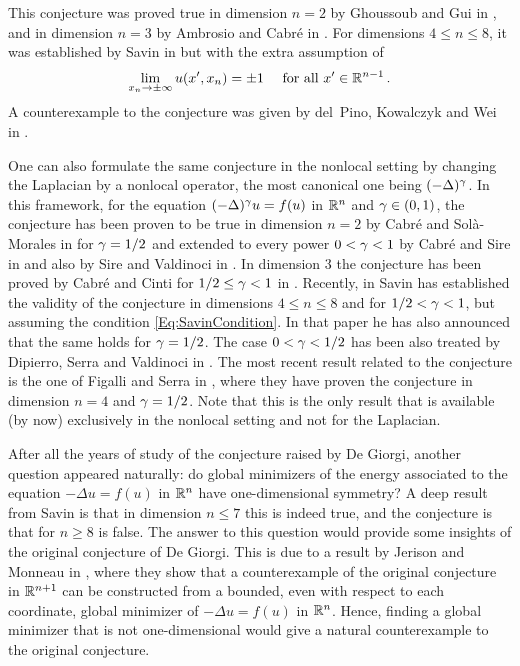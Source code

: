 This conjecture was proved true in dimension $n=2$ by Ghoussoub and Gui in \cite{GhoussoubGui}, and in dimension $n=3$ by Ambrosio and Cabré in \cite{AmbrosioCabre}. For dimensions $4\leq n \leq 8$, it was established by Savin in \cite{Savin-DeGiorgi} but with the extra assumption of
\begin{equation}
\label{Eq:SavinCondition}
	\lim_{x_n \to \pm \infty} u(x',x_n) = \pm 1 \quad \text{ for all } x'\in \mathbb{R}^{n-1}\,.
\end{equation}
A counterexample to the conjecture was given by del~Pino, Kowalczyk and Wei in \cite{delPinoKowalczykWei}. 


One can also formulate the same conjecture in the nonlocal setting by changing the Laplacian by a nonlocal operator, the most canonical one being $(-\Delta)^\gamma$. In this framework, for the equation $(-\Delta)^\gamma u = f(u)$ in $\mathbb{R}^n$ and $\gamma\in (0,1)$, the conjecture has been proven to be true in dimension $n=2$ by Cabré and Solà-Morales in \cite{CabreSolaMorales} for $\gamma=1/2$ and extended to every power $0<\gamma<1$ by Cabré and Sire in \cite{CabreSireI} and also by Sire and Valdinoci in \cite{SireValdinoci}. In dimension $3$ the conjecture has been proved by Cabré and Cinti for $1/2 \leq \gamma < 1$ in \cite{CabreCinti-EnergyHalfL, CabreCinti-SharpEnergy}. Recently, in \cite{Savin-Fractional} Savin has established the validity of the conjecture in dimensions $4\leq n \leq 8$ and for $1/2 < \gamma < 1$, but assuming the condition \eqref{Eq:SavinCondition}. In that paper he has also announced that the same holds for $\gamma=1/2$. The case $0<\gamma<1/2$ has been also treated by Dipierro, Serra and Valdinoci in \cite{DipierroSerraValdinoci} . The most recent result related to the conjecture is the one of Figalli and Serra in \cite{FigalliSerra}, where they have proven the conjecture in dimension $n=4$ and $\gamma=1/2$. Note that this is the only result that is available (by now) exclusively in the nonlocal setting and not for the Laplacian.

After all the years of study of the conjecture raised by De Giorgi, another question appeared naturally: do global minimizers of the energy associated to the equation  $-\Delta u = f(u)$ in $\mathbb{R}^n$ have one-dimensional symmetry? A deep result from Savin \cite{Savin-DeGiorgi} is that in dimension $n \leq 7$ this is indeed true, and the conjecture is that for $n\geq 8$ is false. The answer to this question would provide some insights of the original conjecture of De Giorgi. This is due to a result by Jerison and Monneau in \cite{JerisonMonneau}, where they show that a counterexample of the original conjecture in $\mathbb{R}^{n+1}$ can be constructed from a bounded, even with respect to each coordinate, global minimizer of $-\Delta u = f(u)$ in $\mathbb{R}^n$. Hence, finding a global minimizer that is not one-dimensional would give a natural counterexample to the original conjecture.

